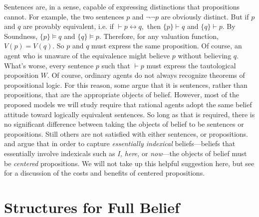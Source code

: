


Sentences are, in a sense, capable of expressing distinctions that propositions
cannot. For example, the two sentences $p$ and $\neg \neg p$ are obviously
distinct. But if $p$ and $q$ are provably equivalent, i.e. if $\vdash p
\leftrightarrow q,$ then $\{p\}\vdash q$ and $\{q\} \vdash p.$ By Soundness,
$\{p\} \vDash q$ and $\{q\}\vDash p.$ Therefore, for any valuation function,
$V(p)=V(q).$ So $p$ and $q$ must express the same proposition. Of course, an
agent who is unaware of the equivalence might believe $p$ without believing $q$.
What's worse, every sentence $p$ such that $\vdash p$ must express the
tautological proposition $W$. Of course, ordinary agents do not always recognize
theorems of propositional logic. For this reason, some argue that it is
sentences, rather than propositions, that are the appropriate objects of belief.
However, most of the proposed models we will study require that rational agents
adopt the same belief attitude toward logically equivalent sentences. So long as
that is required, there is no significant difference between taking the objects
of belief to be sentences or propositions. Still others are not satisfied with
either sentences, or propositions. \citet{perry1979problem,lewis1979attitudes}
and \citet{stalnaker1981indexical} argue that in order to capture {\em
essentially indexical} beliefs---beliefs that essentially involve indexicals
such as {\em I, here,} or {\em now}---the objects of belief must be {\em
centered} propositions. We will not take up this helpful suggestion here, but
see \citet{liao2012centered} for a discussion of the costs and benefits of
centered propositions.


\section{Structures for Full Belief}  
